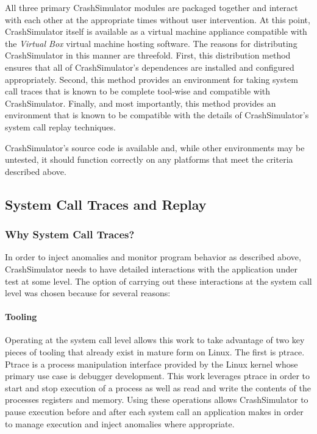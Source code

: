     All three primary CrashSimulator modules are packaged together and interact with each other at the appropriate times
    without user intervention. At this point, CrashSimulator itself is available as a virtual machine appliance
    compatible with the \emph{Virtual Box} virtual machine hosting software. The reasons for distributing CrashSimulator
    in this manner are threefold. First, this distribution method ensures that all of CrashSimulator's dependences are
    installed and configured appropriately. Second, this method provides an environment for taking system call traces
    that is known to be complete tool-wise and compatible with CrashSimulator. Finally, and most importantly, this
    method provides an environment that is known to be compatible with the details of CrashSimulator's system call
    replay techniques.

    CrashSimulator's source code is available and, while other environments may be untested, it should function
    correctly on any platforms that meet the criteria described above.

    \subsection{System Call Traces and Replay}

        \subsubsection{Why System Call Traces?}

        In order to inject anomalies and monitor program behavior as described above, CrashSimulator needs to have detailed
        interactions with the application under test at some level.  The option of carrying out these interactions at the
        system call level was chosen because for several reasons:

        \paragraph{Tooling}

        Operating at the system call level allows this work to take advantage of two key pieces of tooling that already
        exist in mature form on Linux.  The first is ptrace. Ptrace is a process manipulation interface provided by the
        Linux kernel whose primary use case is debugger development.  This work leverages ptrace in order to start and
        stop execution of a process as well as read and write the contents of the processes registers and memory.  Using
        these operations allows CrashSimulator to pause execution before and after each system call an application makes
        in order to manage execution and inject anomalies where appropriate.

